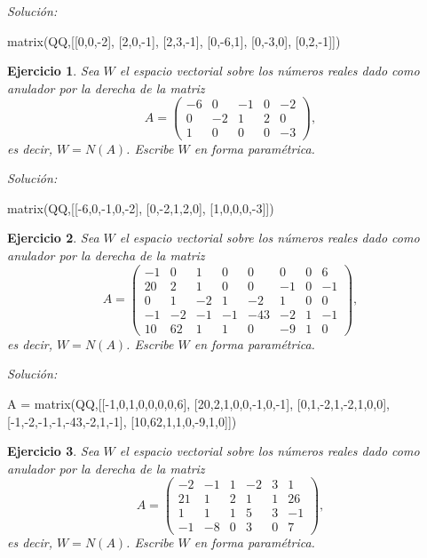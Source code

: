 \documentclass{amsart}
\newtheorem{ejer}{Ejercicio}
\begin{document}
{\it Soluci\'on:}

\begin{sageblock}
matrix(QQ,[[0,0,-2],
[2,0,-1],
[2,3,-1],
[0,-6,1],
[0,-3,0],
[0,2,-1]])
\end{sageblock}



\begin{ejer} Sea $W$ el espacio vectorial sobre los números reales dado
como anulador por la derecha de la matriz 
\[A = \left(\begin{array}{rrrrr}
-6 & 0 & -1 & 0 & -2 \\
0 & -2 & 1 & 2 & 0 \\
1 & 0 & 0 & 0 & -3
\end{array}\right),\]
es decir, $W = N(A)$. Escribe $W$ en forma param\'etrica.
\end{ejer}

{\it Soluci\'on:}

\begin{sageblock}
matrix(QQ,[[-6,0,-1,0,-2],
[0,-2,1,2,0],
[1,0,0,0,-3]])
\end{sageblock}



\begin{ejer} Sea $W$ el espacio vectorial sobre los números reales dado
como anulador por la derecha de la matriz 
\[A = \left(\begin{array}{rrrrrrrr}
-1 & 0 & 1 & 0 & 0 & 0 & 0 & 6 \\
20 & 2 & 1 & 0 & 0 & -1 & 0 & -1 \\
0 & 1 & -2 & 1 & -2 & 1 & 0 & 0 \\
-1 & -2 & -1 & -1 & -43 & -2 & 1 & -1 \\
10 & 62 & 1 & 1 & 0 & -9 & 1 & 0
\end{array}\right),\]
es decir, $W = N(A)$. Escribe $W$ en forma param\'etrica.
\end{ejer}

{\it Soluci\'on:}

\begin{sageblock}
A = matrix(QQ,[[-1,0,1,0,0,0,0,6],
[20,2,1,0,0,-1,0,-1],
[0,1,-2,1,-2,1,0,0],
[-1,-2,-1,-1,-43,-2,1,-1],
[10,62,1,1,0,-9,1,0]])
\end{sageblock}



\begin{ejer} Sea $W$ el espacio vectorial sobre los números reales dado
como anulador por la derecha de la matriz 
\[A = \left(\begin{array}{rrrrrr}
-2 & -1 & 1 & -2 & 3 & 1 \\
21 & 1 & 2 & 1 & 1 & 26 \\
1 & 1 & 1 & 5 & 3 & -1 \\
-1 & -8 & 0 & 3 & 0 & 7
\end{array}\right),\]
es decir, $W = N(A)$. Escribe $W$ en forma param\'etrica.
\end{ejer}
\end{document}
